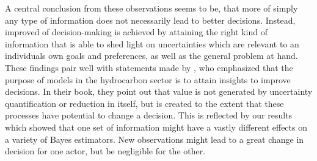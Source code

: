 	A central conclusion from these observations seems to be, that more of simply any type of information does not necessarily lead to better decisions. Instead, improved of decision-making is achieved by attaining the right kind of information that is able to shed light on uncertainties which are relevant to an individuals own goals and preferences, as well as the general problem at hand. These findings pair well with statements made by \citet{bratvold2010making}, who emphasized that the purpose of models in the hydrocarbon sector is to attain insights to improve decisions. In their book, they point out that value is not generated by uncertainty quantification or reduction in itself, but is created to the extent that these processes have potential to change a decision. This is reflected by our results which showed that one set of information might have a vastly different effects on a variety of Bayes estimators. New observations might lead to a great change in decision for one actor, but be negligible for the other.	
